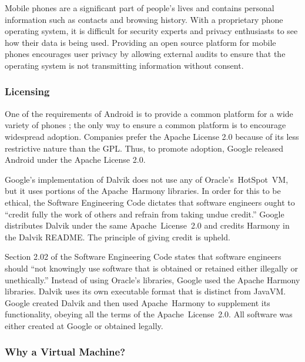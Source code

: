\documentclass[11pt]{article}
\begin{document}
\begin{multicols}{2}
Mobile phones are a significant part of people's lives and contains personal
information such as contacts and browsing history.  With a proprietary phone
operating system, it is difficult for security experts and privacy enthusiasts
to see how their data is being used.  Providing an open source platform for
mobile phones encourages user privacy by allowing external audits to ensure that
the operating system is not transmitting information without consent.


\subsubsection{Licensing} %
\label{sub:licensing}

One of the requirements of Android is to provide a common platform for a wide
variety of phones \cite{open-handset-alliance-ann}; the only way to ensure a
common platform is to encourage widespread adoption.  Companies prefer the
Apache License 2.0 because of its less restrictive nature than the GPL.
\cite{why-apache2-license}  Thus, to promote adoption, Google released Android
under the Apache License 2.0.

Google's implementation of Dalvik does not use any of Oracle's~HotSpot~VM, but
it uses portions of the Apache~Harmony libraries.  In order for this to be
ethical, the Software Engineering Code dictates that software engineers ought to
``credit fully the work of others and refrain from taking undue credit.''
\cite[\S 7.03]{secode}  Google distributes Dalvik under the same
Apache~License~2.0 and credits Harmony in the Dalvik README.
\cite{dalvik-readme}  The principle of giving credit is upheld.

Section 2.02 of the Software Engineering Code states that software engineers
should ``not knowingly use software that is obtained or retained either
illegally or unethically.'' \cite[\S 2.02]{secode}  Instead of using Oracle's
libraries, Google used the Apache Harmony libraries.  Dalvik uses its own
executable format that is distinct from JavaVM.  Google created Dalvik and then
used Apache~Harmony to supplement its functionality, obeying all the terms of
the Apache~License~2.0.  All software was either created at Google or obtained
legally.


\subsubsection{Why a Virtual Machine?} %
\label{ssub:why-vm}


\end{multicols}
\end{document}
